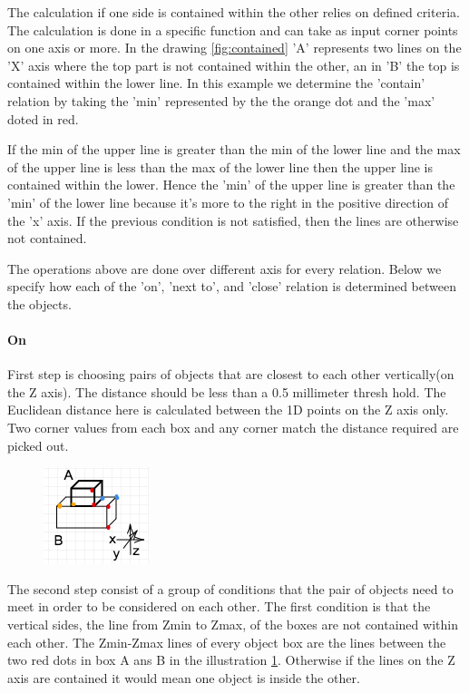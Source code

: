 The calculation if one side is contained within the other relies on defined criteria. The calculation is done in a specific function and  can take as input  corner points on one axis or more. In the drawing \ref{fig:contained} 'A' represents two lines on the 'X' axis where the top part is not contained within the other, an in 'B' the top is contained within the lower line. In this example we determine the 'contain' relation by taking the 'min' represented by the the orange dot and the 'max' doted in red. 

If the min of the upper line is greater than the min of the lower line and the max of the upper line is less than the max of the lower line then the upper line is contained within the lower. Hence the 'min' of the upper line is greater than the 'min' of the lower line because it's more to the right in the positive direction of the 'x' axis. If the previous condition is not satisfied, then the lines are otherwise not contained. 


The operations above are done over different axis for every relation. Below we specify how each of the 'on', 'next to', and 'close' relation is determined between the objects. 

\paragraph{On}



First step is choosing pairs of objects that are closest to each other vertically(on the Z axis). The distance should be less than a 0.5 millimeter thresh hold. The Euclidean distance here is calculated between the 1D points on the Z axis only. Two corner values from each box and any corner match the distance required are picked out. 

\begin{figure}[H]
\includegraphics[scale=0.7]{images/on.png}
\caption{}
\label{fig:on}
\end{figure}


The second step consist of a group of conditions that the pair of objects need to meet in order to be considered on each other. The first condition is that the vertical sides, the line from Zmin to Zmax, of the boxes are not contained within each other. The Zmin-Zmax lines of every object box are the lines between the two red dots in box A ans B in the illustration \ref{fig:on}. Otherwise if the lines on the Z axis are contained it would mean one object is inside the other. 

